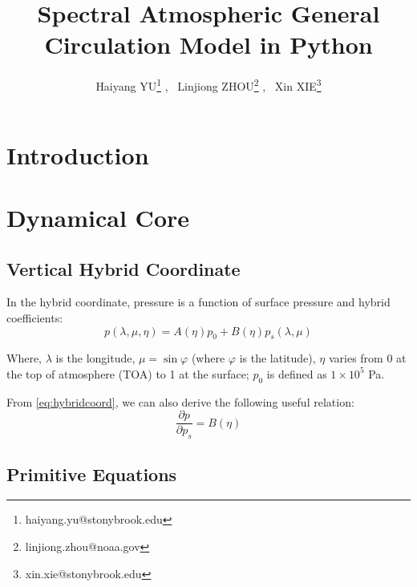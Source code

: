 \documentclass[12pt,a4paper]{book}
\begin{document}
	
	\title{Spectral Atmospheric General Circulation Model in Python}
	\author{Haiyang YU\footnote{haiyang.yu@stonybrook.edu} , \
			Linjiong ZHOU\footnote{linjiong.zhou@noaa.gov} , \
			Xin XIE\footnote{xin.xie@stonybrook.edu}}
	\maketitle

\tableofcontents

\chapter{Introduction} \label{1.introduction}



\chapter{Dynamical Core} \label{2.dynamicalcore}

\section{Vertical Hybrid Coordinate} \label{2.1hybridcoordinate}

In the hybrid coordinate, pressure is a function of surface pressure and hybrid coefficients:
	\begin{equation} \label{eq:hybridcoord}
	p(\lambda,\mu,\eta) = A(\eta)p_0 + B(\eta)p_s(\lambda,\mu)	
	\end{equation}	

Where, $\lambda$ is the longitude, $\mu = \sin \varphi$ (where $\varphi$ is the latitude), $\eta$ varies from 0 at the top of atmosphere (TOA) to 1 at the surface; $p_0$ is defined as $1\times 10^{5}$ Pa. 

From \ref{eq:hybridcoord}, we can also derive the following useful relation:
	\begin{equation} \label{eq:dpdps}
	\frac{\partial p}{\partial p_s} = B(\eta) 	
	\end{equation}	


\section{Primitive Equations} \label{2.2governingequations}
\end{document}
